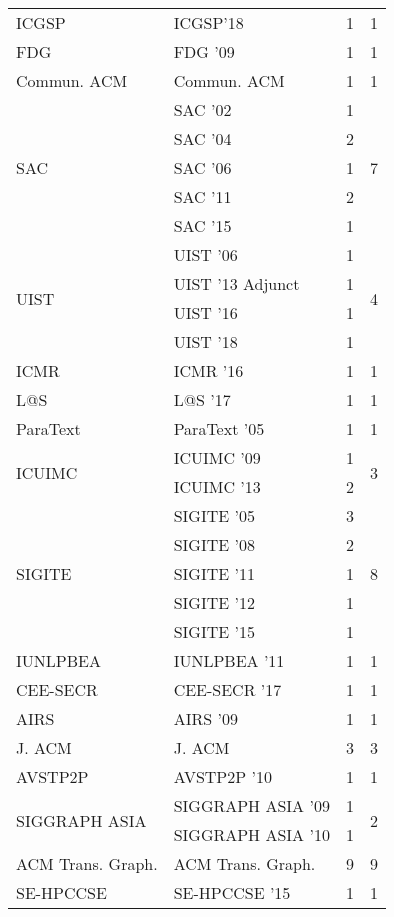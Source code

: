 \begin{table*}[t]
\begin{tabular}{llrr}
\multirow{1}{*}{ICGSP} & ICGSP'18 & 1 & \multirow{1}{*}{1}\\
\multirow{1}{*}{FDG } & FDG '09 & 1 & \multirow{1}{*}{1}\\
\multirow{1}{*}{Commun. ACM} & Commun. ACM & 1 & \multirow{1}{*}{1}\\
\multirow{5}{*}{SAC } & SAC '02 & 1 & \multirow{5}{*}{7}\\
& SAC '04 & 2 &\\
& SAC '06 & 1 &\\
& SAC '11 & 2 &\\
& SAC '15 & 1 &\\
\multirow{4}{*}{UIST } & UIST '06 & 1 & \multirow{4}{*}{4}\\
& UIST '13 Adjunct & 1 &\\
& UIST '16 & 1 &\\
& UIST '18 & 1 &\\
\multirow{1}{*}{ICMR } & ICMR '16 & 1 & \multirow{1}{*}{1}\\
\multirow{1}{*}{L@S } & L@S '17 & 1 & \multirow{1}{*}{1}\\
\multirow{1}{*}{ParaText } & ParaText '05 & 1 & \multirow{1}{*}{1}\\
\multirow{2}{*}{ICUIMC } & ICUIMC '09 & 1 & \multirow{2}{*}{3}\\
& ICUIMC '13 & 2 &\\
\multirow{5}{*}{SIGITE } & SIGITE '05 & 3 & \multirow{5}{*}{8}\\
& SIGITE '08 & 2 &\\
& SIGITE '11 & 1 &\\
& SIGITE '12 & 1 &\\
& SIGITE '15 & 1 &\\
\multirow{1}{*}{IUNLPBEA } & IUNLPBEA '11 & 1 & \multirow{1}{*}{1}\\
\multirow{1}{*}{CEE-SECR } & CEE-SECR '17 & 1 & \multirow{1}{*}{1}\\
\multirow{1}{*}{AIRS } & AIRS '09 & 1 & \multirow{1}{*}{1}\\
\multirow{1}{*}{J. ACM} & J. ACM & 3 & \multirow{1}{*}{3}\\
\multirow{1}{*}{AVSTP2P } & AVSTP2P '10 & 1 & \multirow{1}{*}{1}\\
\multirow{2}{*}{SIGGRAPH ASIA } & SIGGRAPH ASIA '09 & 1 & \multirow{2}{*}{2}\\
& SIGGRAPH ASIA '10 & 1 &\\
\multirow{1}{*}{ACM Trans. Graph.} & ACM Trans. Graph. & 9 & \multirow{1}{*}{9}\\
\multirow{1}{*}{SE-HPCCSE } & SE-HPCCSE '15 & 1 & \multirow{1}{*}{1}\\

\end{tabular}
\end{table*}
